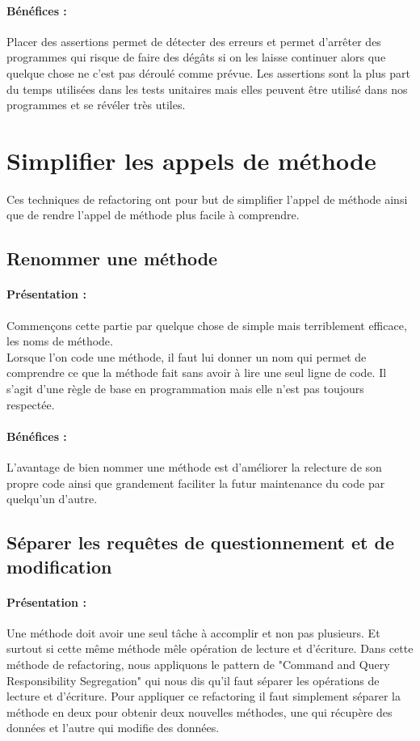 \documentclass[a4paper,twoside,12pt,openright]{report}
\begin{document}
\paragraph{Bénéfices :}
Placer des assertions permet de détecter des erreurs et permet d'arrêter des programmes qui risque de faire des dégâts si on les laisse continuer alors que quelque chose ne c'est pas déroulé comme prévue.
Les assertions sont la plus part du temps utilisées dans les tests unitaires mais elles peuvent être utilisé dans nos programmes et se révéler très utiles.\\

\newpage
\section{Simplifier les appels de méthode}
Ces techniques de refactoring ont pour but de simplifier l'appel de méthode ainsi que de rendre l'appel de méthode plus facile à comprendre.\\



\subsection{Renommer une méthode}
\paragraph{Présentation :}
Commençons cette partie par quelque chose de simple mais terriblement efficace, les noms de méthode.\\
Lorsque l'on code une méthode, il faut lui donner un nom qui permet de comprendre ce que la méthode fait sans avoir à lire une seul ligne de code. Il s'agit d'une règle de base en programmation mais elle n'est pas toujours respectée.

\paragraph{Bénéfices :}
L'avantage de bien nommer une méthode est d'améliorer la relecture de son propre code ainsi que grandement faciliter la futur maintenance du code par quelqu'un d'autre.\\

\subsection{Séparer les requêtes de questionnement et de modification}
\paragraph{Présentation :}
Une méthode doit avoir une seul tâche à accomplir et non pas plusieurs. Et surtout si cette même méthode mêle opération de lecture et d'écriture.
Dans cette méthode de refactoring, nous appliquons le pattern de "Command and Query Responsibility Segregation" qui nous dis qu'il faut séparer les opérations de lecture et d'écriture.
Pour appliquer ce refactoring il faut simplement séparer la méthode en deux pour obtenir deux nouvelles méthodes, une qui récupère des données et l'autre qui modifie des données.
\end{document}
